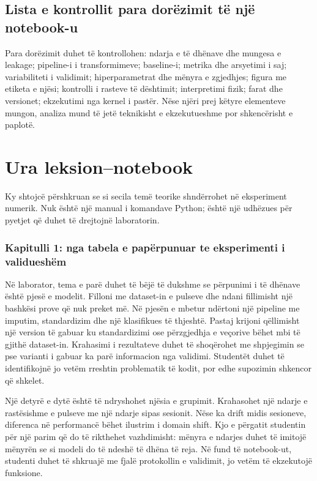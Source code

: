 \documentclass[12pt,a4paper,oneside]{book}
\begin{document}
\section{Lista e kontrollit para dorëzimit të një notebook-u}
Para dorëzimit duhet të kontrollohen: ndarja e të dhënave dhe mungesa e leakage; pipeline-i i transformimeve; baseline-i; metrika dhe arsyetimi i saj; variabiliteti i validimit; hiperparametrat dhe mënyra e zgjedhjes; figura me etiketa e njësi; kontrolli i rasteve të dështimit; interpretimi fizik; farat dhe versionet; ekzekutimi nga kernel i pastër. Nëse njëri prej këtyre elementeve mungon, analiza mund të jetë teknikisht e ekzekutueshme por shkencërisht e paplotë.

\chapter[Leksion--notebook]{Ura leksion--notebook}
Ky shtojcë përshkruan se si secila temë teorike shndërrohet në eksperiment numerik. Nuk është një manual i komandave Python; është një udhëzues për pyetjet që duhet të drejtojnë laboratorin.
\subsection*{Kapitulli 1: nga tabela e papërpunuar te eksperimenti i validueshëm}
Në laborator, tema e parë duhet të bëjë të dukshme se përpunimi i të dhënave është pjesë e modelit. Filloni me dataset-in e pulseve dhe ndani fillimisht një bashkësi prove që nuk preket më. Në pjesën e mbetur ndërtoni një pipeline me imputim, standardizim dhe një klasifikues të thjeshtë. Pastaj krijoni qëllimisht një version të gabuar ku standardizimi ose përzgjedhja e veçorive bëhet mbi të gjithë dataset-in. Krahasimi i rezultateve duhet të shoqërohet me shpjegimin se pse varianti i gabuar ka parë informacion nga validimi. Studentët duhet të identifikojnë jo vetëm rreshtin problematik të kodit, por edhe supozimin shkencor që shkelet.

Një detyrë e dytë është të ndryshohet njësia e grupimit. Krahasohet një ndarje e rastësishme e pulseve me një ndarje sipas sesionit. Nëse ka drift midis sesioneve, diferenca në performancë bëhet ilustrim i domain shift. Kjo e përgatit studentin për një parim që do të rikthehet vazhdimisht: mënyra e ndarjes duhet të imitojë mënyrën se si modeli do të ndeshë të dhëna të reja. Në fund të notebook-ut, studenti duhet të shkruajë me fjalë protokollin e validimit, jo vetëm të ekzekutojë funksione.
\end{document}
